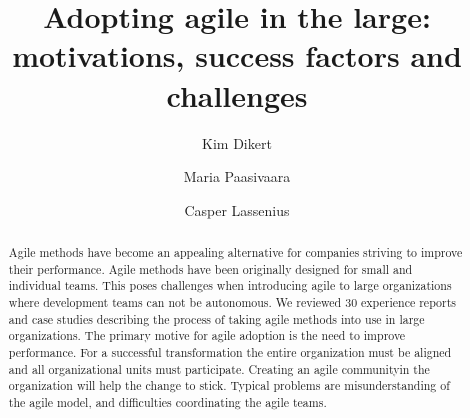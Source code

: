 \documentclass[lnbip]{svmultln}
\begin{document}

\mainmatter


\title{Adopting agile in the large: motivations, success factors and challenges}


\author{Kim Dikert \and Maria Paasivaara \and Casper Lassenius}



\maketitle



\begin{abstract}

Agile methods have become an appealing alternative for companies striving to
improve their performance. Agile methods have been originally designed for small
and individual teams. This poses challenges when introducing agile to large
organizations where development teams can not be autonomous. We reviewed 30
experience reports and case studies describing the process of taking agile
methods into use in large organizations. The primary motive for agile adoption
is the need to improve performance. For a successful transformation the entire
organization must be aligned and all organizational units must participate.
Creating an agile communityin the organization will help the change to stick.
Typical problems are misunderstanding of the agile model, and difficulties
coordinating the agile teams.

\end{abstract}


\end{document}
